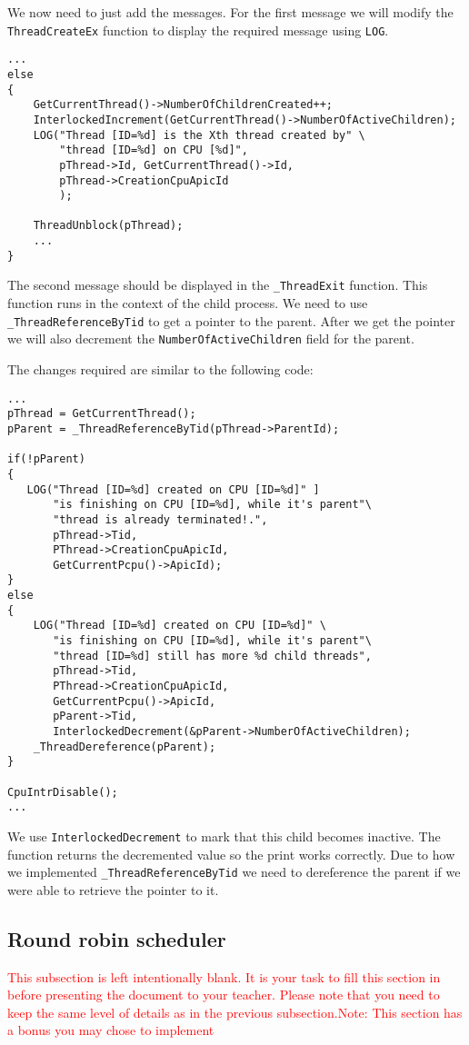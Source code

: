 \documentclass[a4paper,12pt]{report}
\begin{document}
 We now need to just add the messages. For the first message we will modify the \lstinline|ThreadCreateEx| function to display the required message using \lstinline|LOG|.
 
 \begin{lstlisting}
... 
else
{
    GetCurrentThread()->NumberOfChildrenCreated++; 
    InterlockedIncrement(GetCurrentThread()->NumberOfActiveChildren);
    LOG("Thread [ID=%d] is the Xth thread created by" \
        "thread [ID=%d] on CPU [%d]",
        pThread->Id, GetCurrentThread()->Id, 
        pThread->CreationCpuApicId
        );
     
    ThreadUnblock(pThread);
    ... 
}

\end{lstlisting}
 
The second message should be displayed in the \lstinline{_ThreadExit} function. This function runs in the context of the child process. We need to use \lstinline|_ThreadReferenceByTid| to get a pointer to the parent. After we get the pointer we will also decrement the \lstinline|NumberOfActiveChildren| field for the parent.

The changes required are similar to the following code:
\begin{lstlisting}
...
pThread = GetCurrentThread();
pParent = _ThreadReferenceByTid(pThread->ParentId);

if(!pParent)
{
   LOG("Thread [ID=%d] created on CPU [ID=%d]" ]
       "is finishing on CPU [ID=%d], while it's parent"\
       "thread is already terminated!.",
       pThread->Tid,
       PThread->CreationCpuApicId,
       GetCurrentPcpu()->ApicId);
}
else
{
    LOG("Thread [ID=%d] created on CPU [ID=%d]" \
       "is finishing on CPU [ID=%d], while it's parent"\
       "thread [ID=%d] still has more %d child threads",
       pThread->Tid,
       PThread->CreationCpuApicId,
       GetCurrentPcpu()->ApicId,
       pParent->Tid,
       InterlockedDecrement(&pParent->NumberOfActiveChildren);
    _ThreadDereference(pParent);
}

CpuIntrDisable();
...
\end{lstlisting}
 
We use \lstinline|InterlockedDecrement| to mark that this child becomes inactive. The function returns the decremented value so the print works correctly.
Due to how we implemented \lstinline |_ThreadReferenceByTid| we need to dereference the parent if we were able to retrieve the pointer to it.


\subsection{Round robin scheduler}
  \textcolor{red}{This subsection is left intentionally blank. It is your task to fill this section in before presenting the document to your teacher. Please note that you need to keep the same level of details as in the previous subsection.Note: This section has a bonus you may chose to implement } 
 
\end{document}
